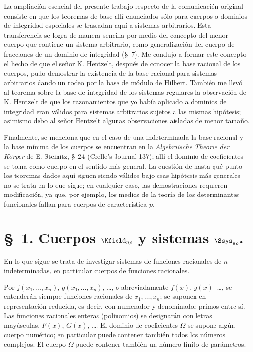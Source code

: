 \documentclass[11pt]{article}
\begin{document}
La ampliación esencial del presente trabajo respecto de la comunicación original consiste en que los teoremas de base allí enunciados sólo para cuerpos o dominios de integridad especiales se trasladan aquí a sistemas arbitrarios. Esta transferencia se logra de manera sencilla por medio del concepto del menor cuerpo que contiene un sistema arbitrario, como generalización del cuerpo de fracciones de un dominio de integridad (\S\ 7). Me condujo a formar este concepto el hecho de que el señor K. Hentzelt, después de conocer la base racional de los cuerpos, pudo demostrar la existencia de la base racional para sistemas arbitrarios dando un rodeo por la base de módulo de Hilbert. También me llevó al teorema sobre la base de integridad de los sistemas regulares la observación de K. Hentzelt de que los razonamientos que yo había aplicado a dominios de integridad eran válidos para sistemas arbitrarios sujetos a las mismas hipótesis; asimismo debo al señor Hentzelt algunas observaciones aisladas de menor tamaño.

Finalmente, se menciona que en el caso de una indeterminada la base racional y la base mínima de los cuerpos se encuentran en la \emph{Algebraische Theorie der Körper} de E. Steinitz, \S\ 24 (Crelle's Journal 137); allí el dominio de coeficientes se toma como cuerpo en el sentido más general. La cuestión de hasta qué punto los teoremas dados aquí siguen siendo válidos bajo esas hipótesis más generales no se trata en lo que sigue; en cualquier caso, las demostraciones requieren modificación, ya que, por ejemplo, los medios de la teoría de los determinantes funcionales fallan para cuerpos de característica $p$.

\section*{\S\ 1. Cuerpos $\Kfield_{n\rho}$ y sistemas $\Ssys_{n\rho}$.}

En lo que sigue se trata de investigar sistemas de funciones racionales de $n$ indeterminadas, en particular cuerpos de funciones racionales.

Por $f(x_1,\ldots,x_n)$, $g(x_1,\ldots,x_n)$, \ldots, o abreviadamente $f(x)$, $g(x)$, \ldots, se entenderán siempre funciones racionales de $x_1,\ldots,x_n$; se suponen en representación reducida, es decir, con numerador y denominador primos entre sí. Las funciones racionales enteras (polinomios) se designarán con letras mayúsculas, $F(x)$, $G(x)$, \ldots. El dominio de coeficientes $\Omega$ se supone algún cuerpo numérico; en particular puede contener también todos los números complejos. El cuerpo $\Omega$ puede contener también un número finito de parámetros.
\end{document}
